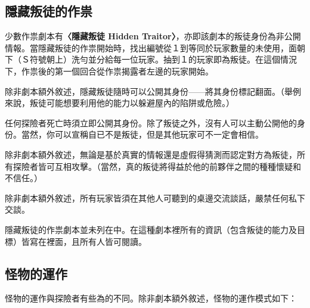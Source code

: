 
\subsection{隱藏叛徒的作祟} \label{ssec:haunts-with-a-hidden-traitor}

少數作祟劇本有\textbf{〈隱藏叛徒 Hidden Traitor〉}，亦即該劇本的叛徒身份為非公開情報。當隱藏叛徒的作祟開始時，找出編號從１到等同於玩家數量的未使用，面朝下（Ｓ符號朝上）洗勻並分給每一位玩家。抽到１的玩家即為叛徒。在這個情況下，作祟後的第一個回合從作祟揭露者左邊的玩家開始。

除非劇本額外敘述，隱藏叛徒隨時可以公開其身份——將其身份標記翻面。（舉例來說，叛徒可能想要利用他的能力以躲避屋內的陷阱或危險。）

任何探險者死亡時須立即公開其身份。除了叛徒之外，沒有人可以主動公開他的身份。當然，你可以宣稱自已不是叛徒，但是其他玩家可不一定會相信。

除非劇本額外敘述，無論是基於真實的情報還是虛假得猜測而認定對方為叛徒，所有探險者皆可互相攻擊。（當然，真的叛徒將得益於他的前夥伴之間的種種懷疑和不信任。）

除非劇本額外敘述，所有玩家皆須在其他人可聽到的桌邊交流談話，嚴禁任何私下交談。

\begin{RuleBox}{}
	隱藏叛徒的作祟劇本並未列在中。在這種劇本裡所有的資訊（包含叛徒的能力及目標）皆寫在裡面，且所有人皆可閱讀。
\end{RuleBox}


\subsection{怪物的運作}\label{ssec:how-monsters-work}

怪物的運作與探險者有些為的不同。除非劇本額外敘述，怪物的運作模式如下：

